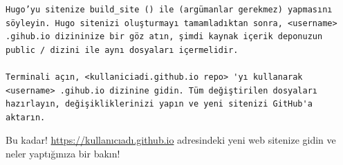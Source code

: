 \documentclass[]{book}
\begin{document}
\begin{verbatim}
Hugo’yu sitenize build_site () ile (argümanlar gerekmez) yapmasını söyleyin. Hugo sitenizi oluşturmayı tamamladıktan sonra, <username> .gihub.io dizininize bir göz atın, şimdi kaynak içerik deponuzun public / dizini ile aynı dosyaları içermelidir.

Terminali açın, <kullaniciadi.github.io repo> 'yı kullanarak <username> .gihub.io dizinine gidin. Tüm değiştirilen dosyaları hazırlayın, değişikliklerinizi yapın ve yeni sitenizi GitHub'a aktarın.
\end{verbatim}

Bu kadar! \url{https://kullanıcıadı.github.io} adresindeki yeni web
sitenize gidin ve neler yaptığınıza bir bakın!


\end{document}
